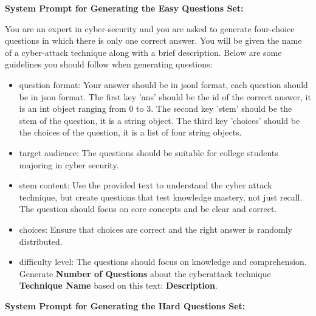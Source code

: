 \begin{figure*} 

\begin{tcolorbox}[
   sharpish corners,
    colback=sub, %
    colframe=main, %
    boxrule = 0pt,          %
    toprule = 12pt,   
    enhanced,               %
    fuzzy shadow = {0pt}{-2pt}{-0.5pt}{0.5pt}{black!35}   
]
\small
\textbf{System Prompt for Generating the Easy Questions Set:}

You are an expert in cyber-security and you are asked to generate four-choice questions in which there is only one correct answer. You will be given the name of a cyber-attack technique along with a brief description. Below are some guidelines you should follow when generating questions:
\begin{itemize}[nolistsep, leftmargin=*]
    \item question format: Your answer should be in jsonl format, each question should be in json format. The first key 'ans' should be the id of the correct answer, it is an int object ranging from 0 to 3. The second key 'stem' should be the stem of the question, it is a string object. The third key 'choices' should be the choices of the question, it is a list of four string objects.
    \item target audience: The questions should be suitable for college students majoring in cyber security.
    \item stem content: Use the provided text to understand the cyber attack technique, but create questions that test knowledge mastery, not just recall. The question should focus on core concepts and be clear and correct.
    \item choices: Ensure that choices are correct and the right answer is randomly distributed.
    \item difficulty level: The questions should focus on knowledge and comprehension.
    Generate \textbf{Number of Questions} about the cyberattack technique \textbf{Technique Name} based on this text: \textbf{Description}.  
\end{itemize}


\vspace{1em} %

\textbf{System Prompt for Generating the Hard Questions Set:}


\end{tcolorbox}
\end{figure*}

